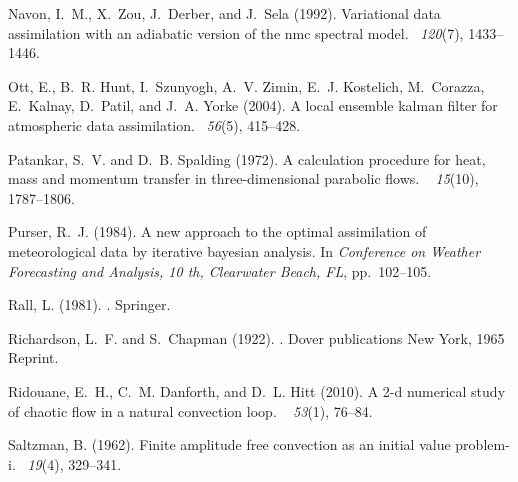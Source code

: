 \documentclass[12pt]{report}
\begin{document}
\begin{thebibliography}{}
Navon, I.~M., X.~Zou, J.~Derber, and J.~Sela (1992).
\newblock Variational data assimilation with an adiabatic version of the nmc
  spectral model.
~{\em 120\/}(7), 1433--1446.

Ott, E., B.~R. Hunt, I.~Szunyogh, A.~V. Zimin, E.~J. Kostelich, M.~Corazza,
  E.~Kalnay, D.~Patil, and J.~A. Yorke (2004).
\newblock A local ensemble kalman filter for atmospheric data assimilation.
~{\em 56\/}(5), 415--428.

Patankar, S.~V. and D.~B. Spalding (1972).
\newblock A calculation procedure for heat, mass and momentum transfer in
  three-dimensional parabolic flows.
~{\em
  15\/}(10), 1787--1806.

Purser, R.~J. (1984).
\newblock A new approach to the optimal assimilation of meteorological data by
  iterative bayesian analysis.
\newblock In {\em Conference on Weather Forecasting and Analysis, 10 th,
  Clearwater Beach, FL}, pp.\  102--105.

Rall, L. (1981).
.
\newblock Springer.

Richardson, L.~F. and S.~Chapman (1922).
.
\newblock Dover publications New York, 1965 Reprint.

Ridouane, E.~H., C.~M. Danforth, and D.~L. Hitt (2010).
\newblock A 2-d numerical study of chaotic flow in a natural convection loop.
~{\em
  53\/}(1), 76--84.

Saltzman, B. (1962).
\newblock Finite amplitude free convection as an initial value problem-i.
~{\em 19\/}(4), 329--341.


\end{thebibliography}
\end{document}

